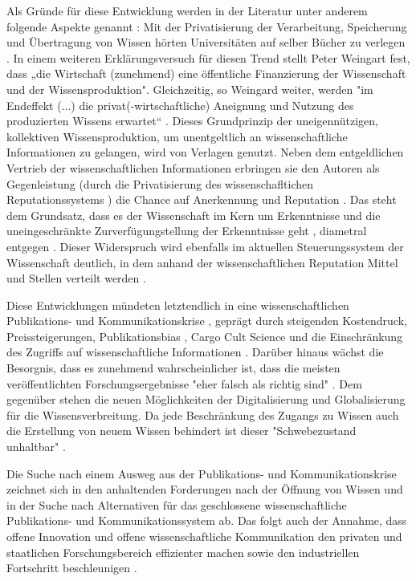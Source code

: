 Als Gründe für diese Entwicklung werden in der Literatur unter anderem folgende Aspekte genannt \cite{suchen}: Mit der Privatisierung der Verarbeitung, Speicherung und Übertragung von Wissen hörten Universitäten auf selber Bücher zu verlegen \cite{cite:0}. In einem weiteren Erklärungsversuch für diesen Trend stellt Peter Weingart fest, dass „die Wirtschaft (zunehmend) eine öffentliche Finanzierung der Wissenschaft und der Wissensproduktion". Gleichzeitig, so Weingard weiter, werden "im Endeffekt (...) die privat(-wirtschaftliche) Aneignung und Nutzung des produzierten Wissens erwartet“ \cite{cite:2}. Dieses Grundprinzip der uneigennützigen, kollektiven Wissensproduktion, um unentgeltlich an wissenschaftliche Informationen zu gelangen, wird von Verlagen genutzt. Neben dem entgeldlichen Vertrieb der wissenschaftlichen Informationen erbringen sie den Autoren als Gegenleistung (durch die Privatisierung des wissenschafltichen Reputationssystems \cite{suchen}) die Chance auf Anerkennung und Reputation \cite{cite:21a}. Das steht dem Grundsatz, dass es der Wissenschaft im Kern um Erkenntnisse und die uneingeschränkte Zurverfügungstellung der Erkenntnisse geht \cite{hanekop_2006}, diametral entgegen \cite{offhaus_2012_institutionelle_repos}. Dieser Widerspruch wird ebenfalls im aktuellen Steuerungssystem der Wissenschaft deutlich, in dem anhand der wissenschaftlichen Reputation Mittel und Stellen verteilt werden \cite{cite:4}.

Diese Entwicklungen mündeten letztendlich in eine wissenschaftlichen Publikations- und Kommunikationskrise \cite{suchen}, geprägt durch steigenden Kostendruck, Preissteigerungen, Publikationsbias \cite{Fanelli_2012}, Cargo Cult Science \cite{Feynman_1974} und die Einschränkung des Zugriffs auf wissenschaftliche Informationen \cite{Hess_2006}. Darüber hinaus wächst die Besorgnis, dass es zunehmend wahrscheinlicher ist, dass die meisten veröffentlichten Forschungsergebnisse "eher falsch als richtig sind" \cite{Ioannidis_2005}. Dem gegenüber stehen die neuen Möglichkeiten der Digitalisierung und Globalisierung für die Wissensverbreitung. Da jede Beschränkung des Zugangs zu Wissen auch die Erstellung von neuem Wissen behindert \cite{cite:5} \cite{cite:8} ist dieser "Schwebezustand unhaltbar" \cite{suchen}. 

Die Suche nach einem Ausweg aus der Publikations- und Kommunikationskrise zeichnet sich in den anhaltenden Forderungen nach der Öffnung von Wissen und in der Suche nach Alternativen für das geschlossene wissenschaftliche Publikations- und Kommunikationssystem ab. Das folgt auch der Annahme, dass offene Innovation und offene wissenschaftliche Kommunikation den privaten und staatlichen Forschungsbereich effizienter machen sowie den industriellen Fortschritt beschleunigen \cite{cite:7}. 

